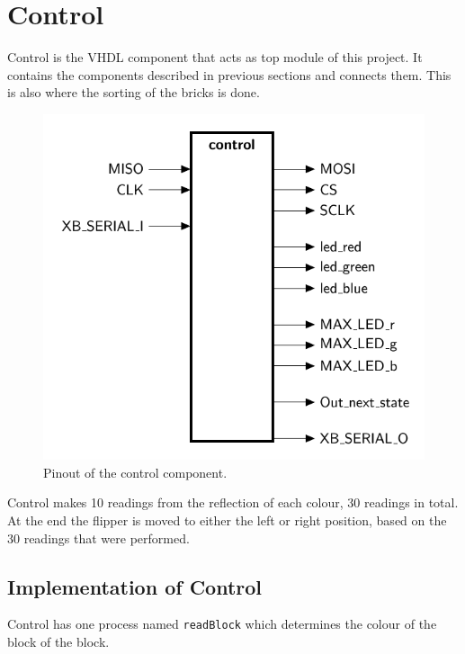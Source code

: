 \section{Control}
\label{sec:control}
Control is the VHDL component that acts as top module of this project. 
It contains the components described in previous sections and connects them.
This is also where the sorting of the bricks is done.
\begin{figure}[h!]
	\centering
	\includegraphics[scale=0.4]{images/ent_control}
	\caption{Pinout of the control component.}
	\label{fig:pinoutcontrol}
\end{figure}
Control makes 10 readings from the reflection of each colour, 30 readings in total. 
At the end the flipper is moved to either the left or right position, based on the 30 readings that were performed.

\subsection{Implementation of Control}


Control has  one process named \texttt{readBlock} which determines the colour of the block of the block. \\


